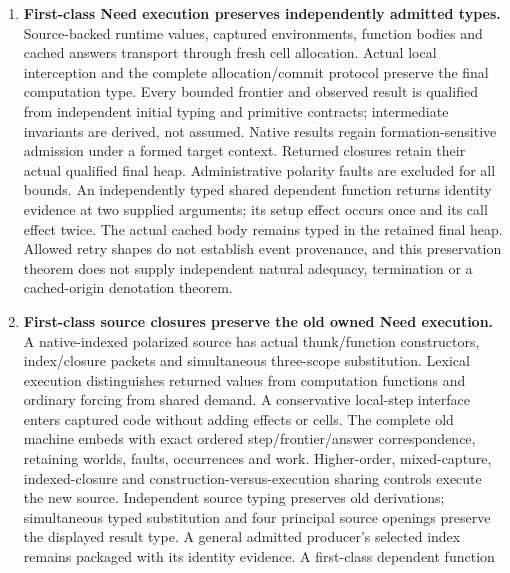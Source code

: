 \documentclass[11pt]{article}
\theoremstyle{definition}
\theoremstyle{remark}
\begin{document}
\begin{enumerate}
  The literal reply pair retains one accepted and one rejected article
  for the same mathematical goal, so caching the selected function does
  not collapse its inputs or cache all applications. The checked finite
  frontiers complete, and generic independent source typing excludes
  administrative domain faults at every bound. These are explicit source
  effects and raw replies, not a cost model, interchangeable programs or
  two different proof-calculus implementations.
\item \textbf{First-class Need execution preserves independently admitted types.}
  Source-backed runtime values, captured environments, function bodies and
  cached answers transport through fresh cell allocation. Actual local
  interception and the complete allocation/commit protocol preserve the
  final computation type. Every bounded frontier and observed result is
  qualified from independent initial typing and primitive contracts;
  intermediate invariants are derived, not assumed. Native results regain
  formation-sensitive admission under a formed target context. Returned
  closures retain their actual qualified final heap. Administrative polarity
  faults are excluded for all bounds. An independently typed shared dependent
  function returns identity evidence at two supplied arguments; its setup
  effect occurs once and its call effect twice. The actual cached body remains
  typed in the retained final heap. Allowed retry shapes do not establish
  event provenance, and this preservation theorem does not supply independent
  natural adequacy, termination or a cached-origin denotation theorem.
\item \textbf{First-class source closures preserve the old owned Need execution.}
  A native-indexed polarized source has actual thunk/function constructors,
  index/closure packets and simultaneous three-scope substitution. Lexical
  execution distinguishes returned values from computation functions and
  ordinary forcing from shared demand. A conservative local-step interface
  enters captured code without adding effects or cells. The complete old
  machine embeds with exact ordered step/frontier/answer correspondence,
  retaining worlds, faults, occurrences and work. Higher-order, mixed-capture,
  indexed-closure and construction-versus-execution sharing controls execute
  the new source. Independent source typing preserves old derivations;
  simultaneous typed substitution and four principal source openings preserve
  the displayed result type. A general admitted producer's selected index
  remains packaged with its identity evidence. A first-class dependent function

\end{enumerate}
\end{document}

